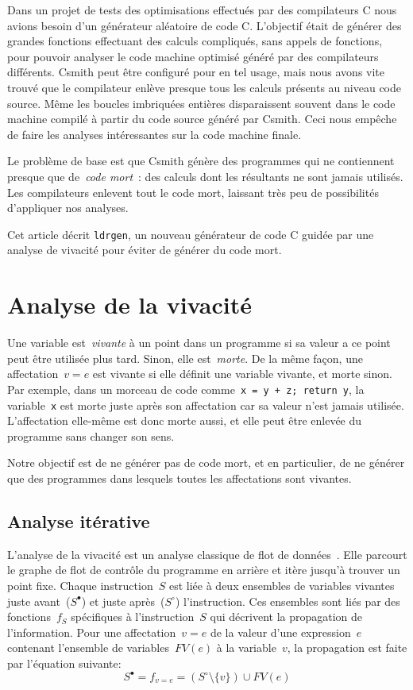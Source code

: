 \documentclass[a4paper]{easychair}
\newcommand\ldrgen{\texttt{ldrgen}}
\newcommand{\liveout}[1]{\ensuremath{#1^{\circ}}}
\newcommand{\livein}[1]{\ensuremath{#1^{\bullet}}}
\def\union{\cup}
\begin{document}
Dans un projet de tests des optimisations effectués par des compilateurs C
nous avions besoin d'un générateur aléatoire de code C. L'objectif était de
générer des grandes fonctions effectuant des calculs compliqués, sans appels
de fonctions, pour pouvoir analyser le code machine optimisé généré par des
compilateurs différents. Csmith peut être configuré pour en tel usage, mais
nous avons vite trouvé que le compilateur enlève presque tous les calculs
présents au niveau code source. Même les boucles imbriquées entières
disparaissent souvent dans le code machine compilé à partir du code source
généré par Csmith. Ceci nous empêche de faire les analyses intéressantes sur
la code machine finale.

Le problème de base est que Csmith génère des programmes qui ne contiennent
presque que de~\emph{code mort}~: des calculs dont les résultants ne sont
jamais utilisés. Les compilateurs enlevent tout le code mort, laissant très
peu de possibilités d'appliquer nos analyses.

Cet article décrit \ldrgen, un nouveau générateur de code C guidée par une
analyse de vivacité pour éviter de générer du code mort.


\section{Analyse de la vivacité}

Une variable est~\emph{vivante} à un point dans un programme si sa valeur a
ce point peut être utilisée plus tard. Sinon, elle est~\emph{morte}. De la
même façon, une affectation~\(v = e\) est vivante si elle définit une
variable vivante, et morte sinon. Par exemple, dans un morceau de code
comme~\texttt{x = y + z; return y}, la variable~\texttt{x} est morte juste
après son affectation car sa valeur n'est jamais utilisée. L'affectation
elle-même est donc morte aussi, et elle peut être enlevée du programme sans
changer son sens.

Notre objectif est de ne générer pas de code mort, et en particulier, de ne
générer que des programmes dans lesquels toutes les affectations sont
vivantes.

\subsection{Analyse itérative}

L'analyse de la vivacité est un analyse classique de flot de
données~\cite{nielson.etal-1999}. Elle parcourt le graphe de flot de
contrôle du programme en arrière et itère jusqu'à trouver un point fixe.
Chaque instruction~\(S\) est liée à deux ensembles de variables vivantes
juste avant~(\(\livein{S}\)) et juste après~(\(\liveout{S}\)) l'instruction.
Ces ensembles sont liés par des fonctions~\(f_S\) spécifiques à
l'instruction~\(S\) qui décrivent la propagation de l'information. Pour une
affectation~\(v = e\) de la valeur d'une expression~\(e\) contenant
l'ensemble de variables~\(FV(e)\) à la variable~\(v\), la propagation est
faite par l'équation suivante:
\[
\livein{S} = f_{v = e}= (\liveout{S} \setminus \{v\}) \union FV(e)
\]
\end{document}
